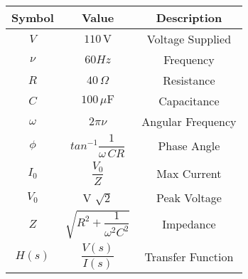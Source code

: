 \begin{tabular}{|c|c|c|}
	\hline
	\textbf{Symbol} & \textbf{Value} & \textbf{Description}\\[6pt]
	\hline
	$V$ & $110\,\text{V}$  & Voltage Supplied\\[2pt]
	\hline
	$\nu$ & $60Hz$ & Frequency\\[2pt]
	\hline
	$R$ & $40\, \Omega $ & Resistance\\[2pt]
	\hline
	$C$ & $100\, \mu\text{F}$ & Capacitance\\[2pt]
	\hline
	$\omega$ & $2\pi \nu $ & Angular Frequency\\[2pt]
	\hline
	$\phi$ & $tan^{-1}\dfrac{1}{\omega\, CR}$ & Phase Angle\\[4pt]
	\hline
	$I_0$ & $\dfrac{V_0}{Z}$ & Max Current\\[2pt]
	\hline
	$V_0$ & V $\sqrt{2}$ & Peak Voltage\\
	\hline
	$Z$ & $\sqrt {R^2 + \dfrac{1}{\omega^2C^2}}$ & Impedance \\[4pt]
	\hline
	$H(s)$ & $\dfrac{V(s)}{I(s)}$  & Transfer Function\\[4pt]
	\hline
\end{tabular}